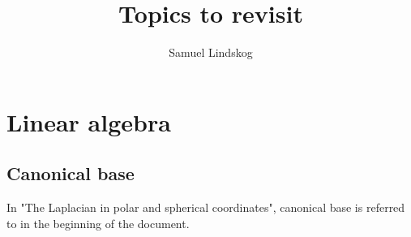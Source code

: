 \documentclass{article}
\theoremstyle{plain}
\theoremstyle{definition}
\begin{document}
\title{Topics to revisit}
\author{Samuel Lindskog}
\maketitle

\section*{Linear algebra}
\subsection{Canonical base}
In "The Laplacian in polar and spherical coordinates", canonical base is referred to in the beginning of the document.
\subsection{}
\end{document}
